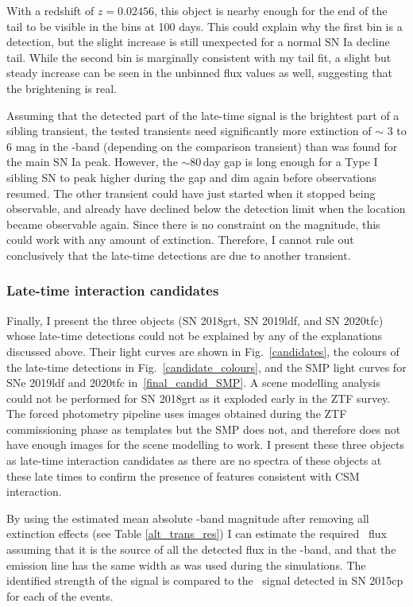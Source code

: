 \documentclass[a4paper,oneside,12pt, class=Latex/Classes/PhDthesisPSnPDF, crop=false]{standalone}
\begin{document}
With a redshift of $z = 0.02456$, this object is nearby enough for the end of the tail to be visible in the bins at 100 days. This could explain why the first bin is a detection, but the slight increase is still unexpected for a normal SN Ia decline tail. While the second bin is marginally consistent with my tail fit, a slight but steady increase can be seen in the unbinned flux values as well, suggesting that the brightening is real.

Assuming that the detected part of the late-time signal is the brightest part of a sibling transient, the tested transients need significantly more extinction of $\sim$ 3 to 6 mag in the \ztfr-band (depending on the comparison transient) than was found for the main SN Ia peak. However, the $\sim 80$\,day gap is long enough for a Type I sibling SN to peak higher during the gap and dim again before observations resumed. The other transient could have just started when it stopped being observable, and already have declined below the detection limit when the location became observable again. Since there is no constraint on the magnitude, this could work with any amount of extinction. Therefore, I cannot rule out conclusively that the late-time detections are due to another transient.\\


\subsubsection{Late-time interaction candidates}
\label{sec:late_time_cand}
Finally, I present the three objects (SN 2018grt, SN 2019ldf, and SN 2020tfc) whose late-time detections could not be explained by any of the explanations discussed above. Their light curves are shown in Fig.~\ref{candidates}, the colours of the late-time detections in Fig.~\ref{candidate_colours}, and the SMP light curves for SNe 2019ldf and 2020tfc in~\ref{final_candid_SMP}. A scene modelling analysis could not be performed for SN 2018grt as it exploded early in the ZTF survey. The forced photometry pipeline uses images obtained during the ZTF commissioning phase as templates but the SMP does not, and therefore does not have enough images for the scene modelling to work. I present these three objects as late-time interaction candidates as there are no spectra of these objects at these late times to confirm the presence of features consistent with CSM interaction.

By using the estimated mean absolute \ztfr-band magnitude after removing all extinction effects (see Table \ref{alt_trans_res}) I can estimate the required \Halpha~flux assuming that it is the source of all the detected flux in the \ztfr-band, and that the emission line has the same width as was used during the simulations. The identified strength of the signal is compared to the \Halpha~signal detected in SN 2015cp for each of the events.\\
\end{document}
